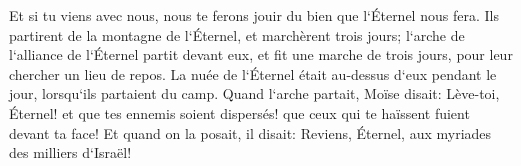 \verse Et si tu viens avec nous, nous te ferons jouir du bien que l`Éternel nous fera. 
\verse Ils partirent de la montagne de l`Éternel, et marchèrent trois jours; l`arche de l`alliance de l`Éternel partit devant eux, et fit une marche de trois jours, pour leur chercher un lieu de repos. 
\verse La nuée de l`Éternel était au-dessus d`eux pendant le jour, lorsqu`ils partaient du camp. 
\verse Quand l`arche partait, Moïse disait: Lève-toi, Éternel! et que tes ennemis soient dispersés! que ceux qui te haïssent fuient devant ta face! 
\verse Et quand on la posait, il disait: Reviens, Éternel, aux myriades des milliers d`Israël! 

